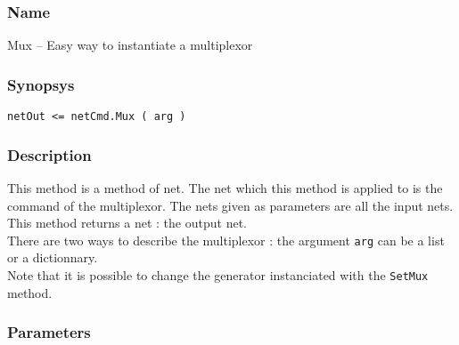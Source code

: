 \subsubsection{Name}

Mux -- Easy way to instantiate a multiplexor

\subsubsection{Synopsys}

\begin{verbatim}
netOut <= netCmd.Mux ( arg )
\end{verbatim}
  
\subsubsection{Description}

This method is a method of net. The net which this method is applied to is the command of the multiplexor. The nets given as parameters are all the input nets. This method returns a net : the output net.\\
There are two ways to describe the multiplexor : the argument \verb-arg- can be a list or a dictionnary.\\
\indent Note that it is possible to change the generator instanciated with the \verb-SetMux- method.

\subsubsection{Parameters}

